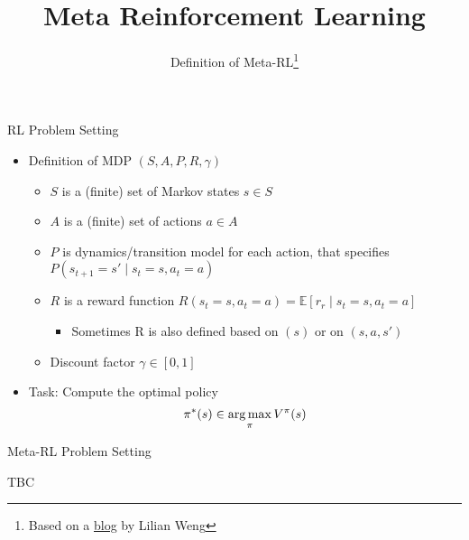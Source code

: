 


\title[Meta-RL]{Meta Reinforcement Learning}
\subtitle{Definition of Meta-RL\footnote{Based on a \href{https://lilianweng.github.io/lil-log/2019/06/23/meta-reinforcement-learning.html}{blog} by Lilian Weng}}



	
	\maketitle

\begin{frame}[c]{RL Problem Setting}

\begin{itemize}
	\item Definition of MDP $(S,A,P, R, \gamma)$
	\begin{itemize}
		\item $S$ is a (finite) set of Markov states $s \in S$
		\item $A$ is a (finite) set of actions $a \in A$
		\item $P$ is dynamics/transition model for each action, that specifies $P(s_{t+1} = s' \mid s_t=s, a_t=a)$
		\item $R$ is a reward function 
		$R(s_t=s, a_t=a) = \mathbb{E}[r_r \mid s_t=s, a_t=a] $
		\begin{itemize}
			\item Sometimes R is also defined based on $(s)$ or on $(s,a,s')$
		\end{itemize}
		\item Discount factor $\gamma \in [0, 1]$
	\end{itemize}
	\bigskip
	\item Task: Compute the optimal policy
		$$ \pi^*(s)  \in \operatorname*{arg\,max}_\pi V^\pi(s)$$
\end{itemize}


\end{frame}
\begin{frame}[c]{Meta-RL Problem Setting}
	
TBC
	
	
\end{frame}
